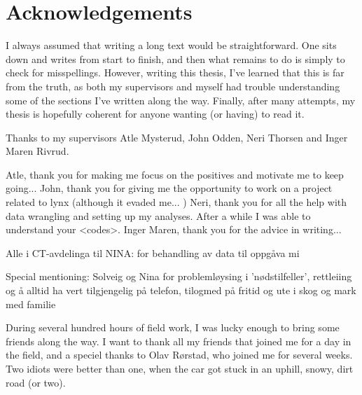 \chapter{Acknowledgements}

I always assumed that writing a long text would be straightforward. One sits down and writes from start to finish, and then what remains to do is simply to check for misspellings.
However, writing this thesis, I've learned that this is far from the truth, as both my supervisors and myself had trouble understanding some of the sections I've written along the way. 
Finally, after many attempts, my thesis is hopefully coherent for anyone wanting (or having) to read it.

Thanks to my supervisors Atle Mysterud, John Odden, Neri Thorsen and Inger Maren Rivrud.

Atle, thank you for making me focus on the positives and motivate me to keep going...
John, thank you for giving me the opportunity to work on a project related to lynx (although it evaded me... )
Neri, thank you for all the help with data wrangling and setting up my analyses. After a while I was able to understand your <codes>.
Inger Maren, thank you for the advice in writing...


Alle i CT-avdelinga til NINA: for behandling av data til oppgåva mi

Special mentioning: Solveig og Nina for problemløysing i 'nødstilfeller', rettleiing og å alltid ha vert tilgjengelig på telefon, tilogmed på fritid og ute i skog og mark med familie

During several hundred hours of field work, I was lucky enough to bring some friends along the way.
I want to thank all my friends that joined me for a day in the field, and a speciel thanks to Olav Rørstad, who joined me for several weeks. Two idiots were better than one, when the car got stuck in an uphill, snowy, dirt road (or two).